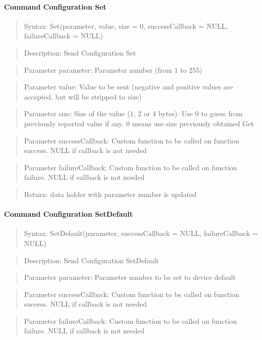 \paragraph {Command Configuration Set}
\begin{quote} Syntax: Set(parameter, value, size = 0, successCallback = NULL, failureCallback = NULL)\end{quote}
\begin{quote} Description: Send Configuration Set\end{quote}
\begin{quote} Parameter parameter: Parameter number (from 1 to 255)\end{quote}
\begin{quote} Parameter value: Value to be sent (negative and positive values are accepted, but will be stripped to size)\end{quote}
\begin{quote} Parameter size: Size of the value (1, 2 or 4 bytes). Use 0 to guess from previously reported value if any. 0 means use size previously obtained Get\end{quote}
\begin{quote} Parameter successCallback: Custom function to be called on function success. NULL if callback is not needed\end{quote}
\begin{quote} Parameter failureCallback: Custom function to be called on function failure. NULL if callback is not needed\end{quote}
\begin{quote} Return: data holder with parameter number is updated \end{quote}


\paragraph {Command Configuration SetDefault}
\begin{quote} Syntax: SetDefault(parameter, successCallback = NULL, failureCallback = NULL)\end{quote}
\begin{quote} Description: Send Configuration SetDefault\end{quote}
\begin{quote} Parameter parameter: Parameter number to be set to device default\end{quote}
\begin{quote} Parameter successCallback: Custom function to be called on function success. NULL if callback is not needed\end{quote}
\begin{quote} Parameter failureCallback: Custom function to be called on function failure. NULL if callback is not needed\end{quote}

